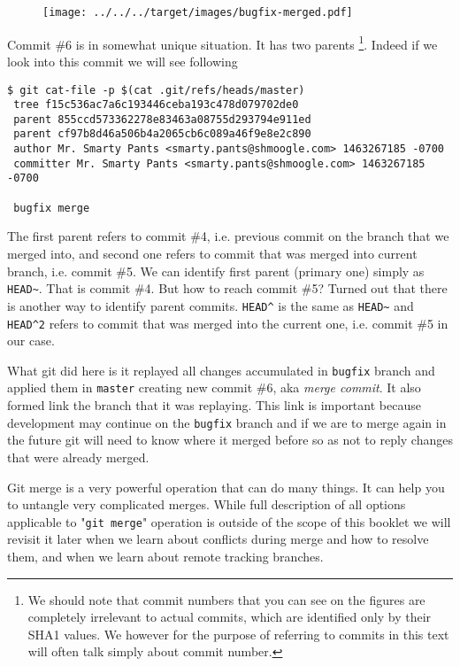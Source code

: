 \documentclass{article}
\theoremstyle{definition}
\begin{document}
        \begin{figure}[h]
        \centering\texttt{[image: ../../../target/images/bugfix-merged.pdf]}
        \caption{\label{fig:bugfix-merged}}
        \end{figure}
        \noindent Commit \#6 is in somewhat unique situation. It has two parents \footnote{We should note that commit
        numbers that you can see on the figures are completely irrelevant to actual commits, which are identified only
        by their SHA1 values. We however for the purpose of referring to commits in this text will often talk simply
        about commit number.}. Indeed if we look into this commit we will see following
        \begin{Verbatim}[frame=single]
 $ git cat-file -p $(cat .git/refs/heads/master)
 tree f15c536ac7a6c193446ceba193c478d079702de0
 parent 855ccd573362278e83463a08755d293794e911ed
 parent cf97b8d46a506b4a2065cb6c089a46f9e8e2c890
 author Mr. Smarty Pants <smarty.pants@shmoogle.com> 1463267185 -0700
 committer Mr. Smarty Pants <smarty.pants@shmoogle.com> 1463267185 -0700

 bugfix merge
        \end{Verbatim}
        The first parent refers to commit \#4, i.e. previous commit on the branch that we merged into, and second one
        refers to commit that was merged into current branch, i.e. commit \#5. We can identify first
        parent (primary one) simply as \texttt{HEAD\textasciitilde}. That is commit \#4. But how to reach 
        commit \#5? Turned out that there is another way to identify parent commits. \texttt{HEAD\^} is the same
        as \texttt{HEAD\textasciitilde} and \texttt{HEAD\^}\texttt{2} refers to commit that was merged into the current
        one, i.e. commit \#5 in our case.

        What git did here is it replayed all changes accumulated in \texttt{bugfix} branch and applied them
        in \texttt{master} creating new commit \#6, aka {\em merge commit}. It also formed link the branch that it was
        replaying. This link is important because development may continue on the \texttt{bugfix} branch and if we are
        to merge again in the future git will need to know where it merged before so as not to reply changes that were
        already merged.

        Git merge is a very powerful operation that can do many things. It can help you to untangle very complicated
        merges. While full description of all options applicable to "\texttt{git merge}" operation is outside of the
        scope of this booklet we will revisit it later when we learn about conflicts during merge and how to resolve
        them, and when we learn about remote tracking branches.
\end{document}
